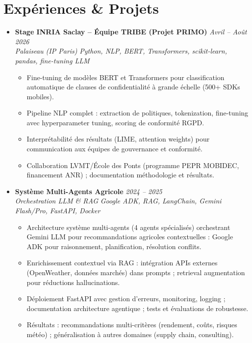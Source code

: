 \documentclass[a4paper,11pt]{article}
\begin{document}
\section{Exp\'eriences \& Projets}
\begin{itemize}[leftmargin=*, label={-}]
    \item \textbf{Stage INRIA Saclay -- \'Equipe TRIBE (Projet PRIMO)} \hfill \textit{Avril -- Ao\^ut 2026} \\
    \textit{Palaiseau (IP Paris)} \hfill \textit{Python, NLP, BERT, Transformers, scikit-learn, pandas, fine-tuning LLM}
    \vspace{-2pt}
    \begin{itemize}[leftmargin=0.4cm, nosep, label=\tiny$\bullet$]
        \item \small{Fine-tuning de modèles BERT et Transformers pour classification automatique de clauses de confidentialité à grande échelle (500+ SDKs mobiles).}
        \item \small{Pipeline NLP complet : extraction de politiques, tokenization, fine-tuning avec hyperparameter tuning, scoring de conformité RGPD.}
        \item \small{Interprétabilité des résultats (LIME, attention weights) pour communication aux équipes de gouvernance et conformité.}
        \item \small{Collaboration LVMT/École des Ponts (programme PEPR MOBIDEC, financement ANR) ; documentation méthodologie et résultats.}
    \end{itemize}
    \vspace{3pt}

    \item \textbf{Syst\`eme Multi-Agents Agricole} \hfill \textit{2024 -- 2025} \\
    \textit{Orchestration LLM \& RAG} \hfill \textit{Google ADK, RAG, LangChain, Gemini Flash/Pro, FastAPI, Docker}
    \vspace{-2pt}
    \begin{itemize}[leftmargin=0.4cm, nosep, label=\tiny$\bullet$]
        \item \small{Architecture système multi-agents (4 agents spécialisés) orchestrant Gemini LLM pour recommandations agricoles contextuelles : Google ADK pour raisonnement, planification, résolution conflits.}
        \item \small{Enrichissement contextuel via RAG : intégration APIs externes (OpenWeather, données marchés) dans prompts ; retrieval augmentation pour réductions hallucinations.}
        \item \small{Déploiement FastAPI avec gestion d'erreurs, monitoring, logging ; documentation architecture agentique ; tests et évaluations de robustesse.}
        \item \small{Résultats : recommandations multi-critères (rendement, coûts, risques météo) ; généralisation à autres domaines (supply chain, consulting).}
    \end{itemize}
    \vspace{3pt}


\end{itemize}
\end{document}
